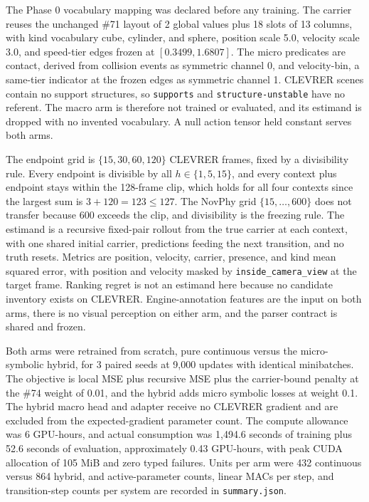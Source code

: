 The Phase 0 vocabulary mapping was declared before any training. The carrier reuses the unchanged \#71 layout of 2 global values plus 18 slots of 13 columns, with kind vocabulary cube, cylinder, and sphere, position scale 5.0, velocity scale 3.0, and speed-tier edges frozen at $[0.3499, 1.6807]$. The micro predicates are contact, derived from collision events as symmetric channel 0, and velocity-bin, a same-tier indicator at the frozen edges as symmetric channel 1. CLEVRER scenes contain no support structures, so \texttt{supports} and \texttt{structure-unstable} have no referent. The macro arm is therefore not trained or evaluated, and its estimand is dropped with no invented vocabulary. A null action tensor held constant serves both arms.

The endpoint grid is $\{15, 30, 60, 120\}$ CLEVRER frames, fixed by a divisibility rule. Every endpoint is divisible by all $h \in \{1,5,15\}$, and every context plus endpoint stays within the 128-frame clip, which holds for all four contexts since the largest sum is $3 + 120 = 123 \le 127$. The NovPhy grid $\{15, \ldots, 600\}$ does not transfer because 600 exceeds the clip, and divisibility is the freezing rule. The estimand is a recursive fixed-pair rollout from the true carrier at each context, with one shared initial carrier, predictions feeding the next transition, and no truth resets. Metrics are position, velocity, carrier, presence, and kind mean squared error, with position and velocity masked by \texttt{inside\_camera\_view} at the target frame. Ranking regret is not an estimand here because no candidate inventory exists on CLEVRER. Engine-annotation features are the input on both arms, there is no visual perception on either arm, and the parser contract is shared and frozen.

Both arms were retrained from scratch, pure continuous versus the micro-symbolic hybrid, for 3 paired seeds at 9{,}000 updates with identical minibatches. The objective is local MSE plus recursive MSE plus the carrier-bound penalty at the \#74 weight of 0.01, and the hybrid adds micro symbolic losses at weight 0.1. The hybrid macro head and adapter receive no CLEVRER gradient and are excluded from the expected-gradient parameter count. The compute allowance was 6 GPU-hours, and actual consumption was 1{,}494.6 seconds of training plus 52.6 seconds of evaluation, approximately 0.43 GPU-hours, with peak CUDA allocation of 105 MiB and zero typed failures. Units per arm were 432 continuous versus 864 hybrid, and active-parameter counts, linear MACs per step, and transition-step counts per system are recorded in \texttt{summary.json}.

